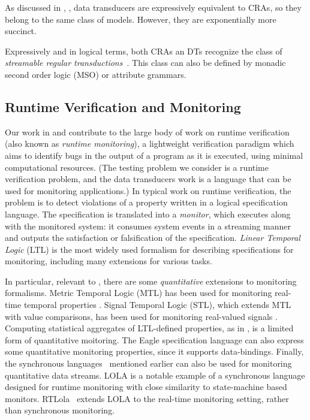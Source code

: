 As discussed in , ,
data transducers are expressively equivalent to CRAs, so they belong to the same class of models. However, they are exponentially more succinct.

Expressively and in logical terms, both CRAs an DTs recognize the class of \emph{streamable regular transductions}~.
This class can also be defined by monadic second order logic (MSO) or attribute grammars.

\subsection{Runtime Verification and Monitoring}

Our work in  and  contribute to the large body of work on runtime verification~\cite{leucker2009brief,havelund2004efficient} (also known as \emph{runtime monitoring}), a
lightweight verification paradigm which aims to identify bugs in the
output of a program as it is executed, using minimal computational
resources.
(The testing problem we consider is a runtime verification problem, and
the data transducers work is a language that can be used for monitoring applications.)
In typical work on runtime verification, the problem is to detect
violations of a property written in a logical specification language.
The specification is translated into a \emph{monitor}, which executes along with the monitored system: it consumes system events in a streaming manner and outputs the satisfaction or falsification of the specification. \emph{Linear Temporal Logic} (LTL) is the most widely used formalism for describing specifications for monitoring, including many extensions for various tasks.

In particular, relevant to , there are some \emph{quantitative} extensions to monitoring formalisms.
Metric Temporal Logic (MTL) has been used for monitoring real-time temporal properties \cite{TR2005MTL}. Signal Temporal Logic (STL), which extends MTL with value comparisons, has been used for monitoring real-valued signals \cite{DDGJJS2017}.
Computing statistical aggregates of LTL-defined properties, as in \cite{finkbeiner2002collecting}, is a limited form of quantitative moitoring.
The Eagle specification language \cite{barringer2004rule} can also express some quantitative monitoring properties, since it supports data-bindings.
Finally, the synchronous languages~\cite{BCEHlGdS2003SL} mentioned earlier can also be used for monitoring quantitative data streams.
LOLA \cite{d2005lola,bozzelli2016foundations} is a notable example of a synchronous language designed for runtime monitoring
with close similarity to state-machine based monitors.
RTLola~\cite{faymonville2017real} extends LOLA to the real-time monitoring setting, rather than synchronous monitoring.

